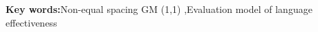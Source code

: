 
\par
\noindent
\textbf{Key words:}Non-equal spacing GM (1,1) ,Evaluation model of language effectiveness 
